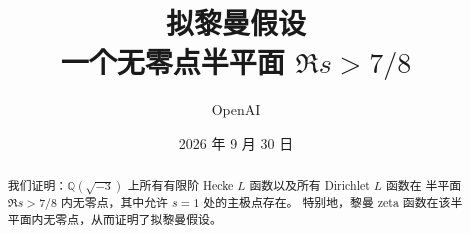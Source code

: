 \documentclass[11pt,a4paper]{article}
\title{拟黎曼假设\\[0.5em]
\large 一个无零点半平面 \texorpdfstring{$\Re s>7/8$}{Re(s)>7/8}}
\author{OpenAI}
\date{2026 年 9 月 30 日}
\numberwithin{equation}{section}
\numberwithin{figure}{section}
\theoremstyle{definition}
\theoremstyle{remark}
\begin{document}
\maketitle

\begin{abstract}
我们证明：$\mathbb Q(\sqrt{-3})$ 上所有有限阶 Hecke $L$ 函数以及所有 Dirichlet $L$ 函数在
半平面 $\Re s>7/8$ 内无零点，其中允许 $s=1$ 处的主极点存在。
特别地，黎曼 zeta 函数在该半平面内无零点，从而证明了拟黎曼假设。
\end{abstract}

\tableofcontents
\clearpage
\end{document}
